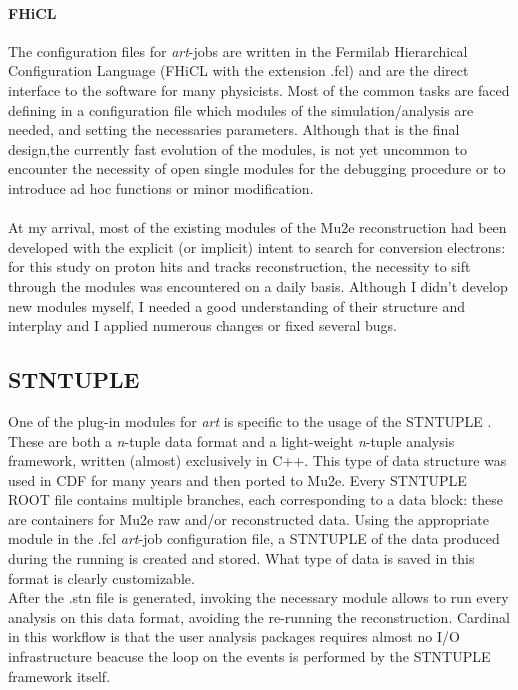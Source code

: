 \documentclass[12pt,a4paper,openright, oneside, titlepage]{book} %
\begin{document}
\paragraph{FHiCL} The configuration files for \textit{art}-jobs are written in the Fermilab Hierarchical Configuration Language (FHiCL with the extension .fcl) and are the direct interface to the software for many physicists. 
Most of the common tasks are faced defining in a configuration file which modules of the simulation/analysis are needed, and setting the necessaries parameters. 
Although that is the final design,the
currently fast evolution of the modules, is not yet uncommon to encounter the necessity of open single modules for the debugging procedure or to introduce ad hoc functions or minor modification.\\ \\
At my arrival, most of the existing modules of the Mu2e reconstruction had been developed with the explicit (or implicit) intent to search for conversion electrons: for this study on proton hits and tracks reconstruction, the necessity to sift through the modules was encountered on a daily basis. 
Although I didn't develop new modules myself, I needed a good understanding of their structure and interplay and I applied numerous changes or fixed several bugs.

\subsection{STNTUPLE}
One of the plug-in modules for \textit{art} is specific to the usage of the STNTUPLE \cite{stntuple}\cite{stntuple:giani}.
These are both a \textit{n}-tuple data format and a light-weight \textit{n}-tuple analysis framework, written (almost) exclusively in C++. 
This type of data structure was used in CDF for many years and then ported to Mu2e. 
Every STNTUPLE ROOT file contains multiple branches, each corresponding to a data block: these are containers for Mu2e raw and/or reconstructed data. 
Using the appropriate module in the .fcl \textit{art}-job configuration file, a STNTUPLE of the data produced during the running is created and stored. 
What type of data is saved in this format is clearly customizable.\\
After the .stn file is generated, invoking the necessary module allows to run every analysis on this data format, avoiding the re-running the reconstruction. Cardinal in this workflow is that the user analysis packages requires almost no I/O infrastructure beacuse the loop on the events is performed by the STNTUPLE framework itself.
\end{document}
